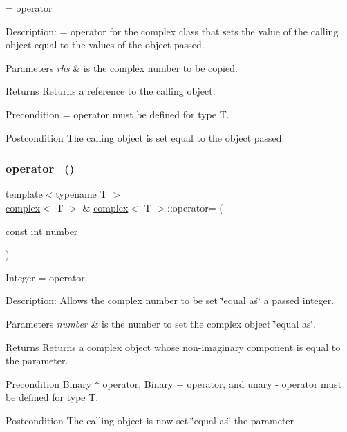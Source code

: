 = operator 

Description\+: = operator for the complex class that sets the value of the calling object equal to the values of the object passed. 
\begin{DoxyParams}{Parameters}
{\em rhs} & is the complex number to be copied. \\
\hline
\end{DoxyParams}
\begin{DoxyReturn}{Returns}
Returns a reference to the calling object. 
\end{DoxyReturn}
\begin{DoxyPrecond}{Precondition}
= operator must be defined for type T. 
\end{DoxyPrecond}
\begin{DoxyPostcond}{Postcondition}
The calling object is set equal to the object passed. 
\end{DoxyPostcond}
\mbox{\label{classcomplex_a0e0def25b2e4c7da5c8e845132560d2b}} 
\subsubsection{\texorpdfstring{operator=()}{operator=()}\hspace{0.1cm}{\footnotesize\ttfamily [2/2]}}
{\footnotesize\ttfamily template$<$typename T $>$ \\
\hyperlink{classcomplex}{complex}$<$ T $>$ \& \hyperlink{classcomplex}{complex}$<$ T $>$\+::operator= (\begin{DoxyParamCaption}\item[{const int}]{number }\end{DoxyParamCaption})}



Integer = operator. 

Description\+: Allows the complex number to be set \char`\"{}equal as\char`\"{} a passed integer. 
\begin{DoxyParams}{Parameters}
{\em number} & is the number to set the complex object \char`\"{}equal as\char`\"{}. \\
\hline
\end{DoxyParams}
\begin{DoxyReturn}{Returns}
Returns a complex object whose non-\/imaginary component is equal to the parameter. 
\end{DoxyReturn}
\begin{DoxyPrecond}{Precondition}
Binary $\ast$ operator, Binary + operator, and unary -\/ operator must be defined for type T. 
\end{DoxyPrecond}
\begin{DoxyPostcond}{Postcondition}
The calling object is now set \char`\"{}equal as\char`\"{} the parameter 
\end{DoxyPostcond}
\mbox{\label{classcomplex_a53710ae99345025cc52a6ecc1804cb8d}} 
